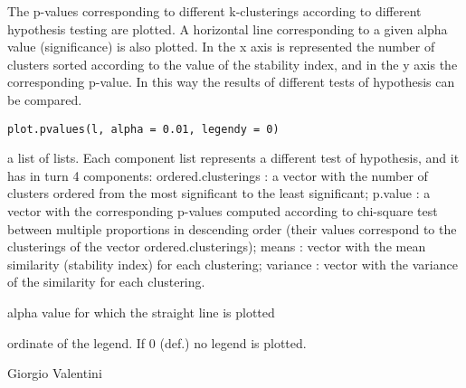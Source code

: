 \documentclass{article}
\begin{document}
\begin{Description}\relax
The p-values corresponding to different k-clusterings according to different hypothesis testing are plotted. A horizontal line corresponding to
a given alpha value (significance) is also plotted. In the x axis is represented the number of clusters sorted according to the value of the stability index,
and in the y axis the corresponding p-value.
In this way the results of different tests of hypothesis can be compared.
\end{Description}
\begin{Usage}
\begin{verbatim}
plot.pvalues(l, alpha = 0.01, legendy = 0)
\end{verbatim}
\end{Usage}
\begin{Arguments}
\begin{ldescription}
\item[\code{l}] a list of lists. Each component list represents a different test of hypothesis, and it has in turn 4 components:              
ordered.clusterings : a vector with the number of clusters ordered from the most significant to the least significant;
p.value : a vector with the corresponding p-values computed according to chi-square test between multiple proportions
in descending order (their values correspond to the clusterings of the vector ordered.clusterings);
means : vector with the mean similarity (stability index) for each clustering;
variance : vector with the variance of the similarity for each clustering.
\item[\code{alpha}] alpha value for which the straight line is plotted 
\item[\code{legendy}] ordinate of the legend. If 0 (def.) no legend is plotted. 
\end{ldescription}
\end{Arguments}
\begin{Author}\relax
Giorgio Valentini 
\end{Author}
\begin{SeeAlso}\relax
{}
\end{SeeAlso}
\end{document}
